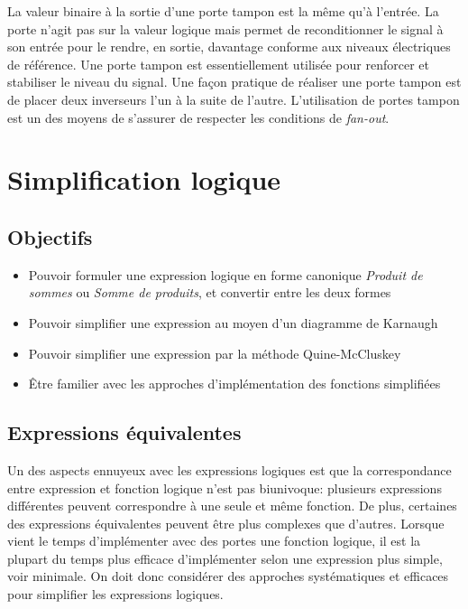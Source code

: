 \documentclass[11pt]{article}
\begin{document}
La valeur binaire à la sortie d'une porte tampon est la même qu'à
l'entrée. La porte n'agit pas sur la valeur logique mais permet de
reconditionner le signal à son entrée pour le rendre, en sortie,
davantage conforme aux niveaux électriques de référence. Une porte
tampon est essentiellement utilisée pour renforcer et stabiliser le
niveau du signal. Une façon pratique de réaliser une porte tampon est
de placer deux inverseurs l'un à la suite de l'autre. L'utilisation de
portes tampon est un des moyens de s'assurer de respecter les
conditions de \emph{fan-out}.


\section{Simplification logique}
\label{sec:orgb80f93c}


\subsection{Objectifs}
\label{sec:org50d6402}
\begin{itemize}
\item Pouvoir formuler une expression logique en forme canonique \emph{Produit
de sommes} ou \emph{Somme de produits}, et convertir entre les deux formes
\item Pouvoir simplifier une expression au moyen d'un diagramme de
Karnaugh
\item Pouvoir simplifier une expression par la méthode Quine-McCluskey
\item Être familier avec les approches d'implémentation des fonctions
simplifiées
\end{itemize}


\subsection{Expressions équivalentes}
\label{sec:org43b37fa}

Un des aspects ennuyeux avec les expressions logiques est que la
correspondance entre expression et fonction logique n'est pas
biunivoque: plusieurs expressions différentes peuvent correspondre à
une seule et même fonction. De plus, certaines des expressions
équivalentes peuvent être plus complexes que d'autres. Lorsque vient
le temps d'implémenter avec des portes une fonction logique, il est la
plupart du temps plus efficace d'implémenter selon une expression plus
simple, voir minimale. On doit donc considérer des approches
systématiques et efficaces pour simplifier les expressions logiques.
\end{document}
